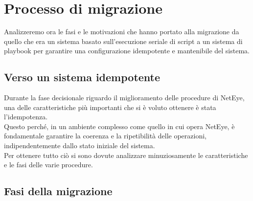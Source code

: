 \section{Processo di migrazione}
\label{sec:processo_migrazione}

Analizzeremo ora le fasi e le motivazioni che hanno portato alla migrazione da quello
che era un sistema basato sull'esecuzione seriale di script a un sistema di playbook
per garantire una configurazione idempotente e mantenibile del sistema.

\subsection{Verso un sistema idempotente}
\label{sub:prerequisiti_migrazione}

Durante la fase decisionale riguardo il miglioramento delle procedure di NetEye,
una delle caratteristiche più importanti che si è voluto ottenere è stata l'idempotenza.\\
Questo perché, in un ambiente complesso come quello in cui opera NetEye, è fondamentale
garantire la coerenza e la ripetibilità delle operazioni, indipendentemente
dallo stato iniziale del sistema.\\ Per ottenere tutto ciò si sono dovute
analizzare minuziosamente le caratteristiche e le fasi delle varie procedure.

\subsection{Fasi della migrazione}
\label{sub:fasi_migrazione}

